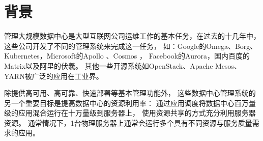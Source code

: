%

\section{背景}

管理大规模数据中心是大型互联网公司运维工作的基本任务，在过去的十几年中，
这些公司开发了不同的管理系统来完成这一任务，
如：Google的Omega\cite{Schwarzkopf_omega_2013}、Borg\cite{borg:2015}、
Kubernetes\cite{Kubernetes}，Microsoft的Apollo \cite{Apollo}、Cosmos \cite{Cosmos}，
Facebook的Aurora\cite{Aurora}，国内百度的Matrix以及阿里的伏羲\cite{Fuxi}。
其他一些开源系统如OpenStack\cite{OpenStack}、Apache Mesos\cite{Hindman:2011:Mesos}、
YARN\cite{YARN}被广泛的应用在工业界。

除提供高可用、高可靠、快速部署等基本管理功能外，
这些数据中心管理系统的另一个重要目标是提高数据中心的资源利用率：
通过应用调度将数据中心百万量级的应用混合运行在十万量级到服务器上，
使用资源共享的方式充分利用服务器资源。
通常情况下，1台物理服务器上通常会运行多个具有不同资源与服务质量需求的应用。

